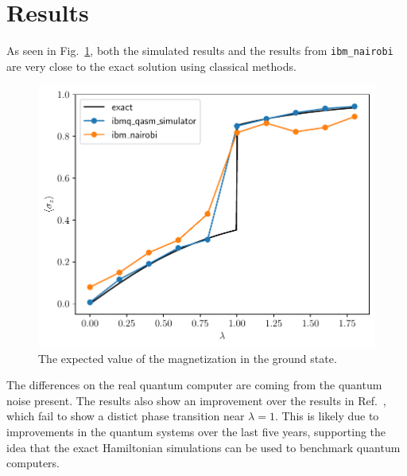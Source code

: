 \documentclass[12pt]{article}
\begin{document}
  \section{Results}

  As seen in Fig.~\ref{fig:ground-state-magnetization}, both the simulated results and the results from \texttt{ibm\_nairobi} are very close to the exact solution using classical methods.
  \begin{figure}
    \centering
    \includegraphics[width=\textwidth]{images/ground-state-magnetization}
    \caption{The expected value of the magnetization in the ground state.%
      \label{fig:ground-state-magnetization}}
  \end{figure}
  The differences on the real quantum computer are coming from the quantum noise present. The results also show an improvement over the results in Ref.~\cite{CerveraLierta18}, which fail to show a distict phase transition near \( \lambda = 1 \). This is likely due to improvements in the quantum systems over the last five years, supporting the idea that the exact Hamiltonian simulations can be used to benchmark quantum computers.
\end{document}
